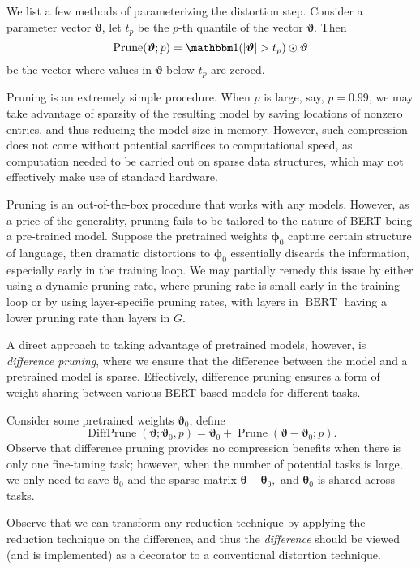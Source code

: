 \documentclass[11pt]{article}
\newcommand{\bert}{\operatorname{BERT}}
\newcommand{\prune}{\operatorname{Prune}}
\newcommand{\diffprune}{\operatorname{DiffPrune}}
\newcommand{\btheta}{{\bm{\theta}}}
\newcommand{\bphi}{{\bm{\phi}}}
\newcommand{\bvartheta}{{\bm{\vartheta}}}
\begin{document}
We list a few methods of parameterizing the distortion step. 
 Consider a parameter vector $\bvartheta$, let
  $t_p$ be the $p$-th quantile of the vector $\bvartheta$. Then \[
  \prune(\bvartheta; p) = \one(|\bvartheta| > t_p) \odot \bvartheta
  \]
  be the vector where values in $\bvartheta$ below $t_p$ are zeroed. 
  
  Pruning is an extremely simple procedure. When $p$ is large, say, $p=0.99$, we
  may take advantage of sparsity of the resulting model by saving locations of
  nonzero entries, and thus reducing the model size in memory. However, such
  compression does not come without potential sacrifices to computational speed,
  as computation needed to be carried out on sparse data structures, which may
  not effectively make use of standard hardware. 
  
  Pruning is an out-of-the-box procedure that works with any models. However, as
  a price of the generality, pruning fails to be tailored to the nature of BERT
  being a pre-trained model. Suppose the pretrained weights $\bphi_0 $ capture
  certain structure of language, then dramatic distortions to $\bphi_0$
  essentially discards the information, especially early in the training loop.
  We may partially remedy this issue by either using a dynamic pruning rate,
  where pruning rate is small early in the training loop or by using
  layer-specific pruning rates, with layers in $\bert$ having a lower pruning
  rate than layers in $G$. 
  
  A direct approach to taking advantage of pretrained models, however, is 
  \emph{difference pruning}, where we ensure that
  the difference between the model and a pretrained model is sparse.
  Effectively, difference pruning ensures a form of weight sharing between
  various BERT-based models for different tasks. 
  
 Consider some pretrained weights
$\bvartheta_0$, define \[
\diffprune(\bvartheta; \bvartheta_0, p ) = \bvartheta_0 + \prune(\bvartheta -
\bvartheta_0 ; p). 
\]
Observe that difference pruning provides no compression benefits when there is
only one fine-tuning task; however, when the number of potential tasks is large,
we only need to save $\btheta_0$ and the sparse matrix $\btheta - \btheta_0,$
and $\btheta_0$ is shared across tasks.

Observe that we can transform any reduction technique by applying the reduction
technique on the difference, and thus the \emph{difference} should be viewed 
(and is implemented) as a decorator to a conventional distortion technique. 
\end{document}

